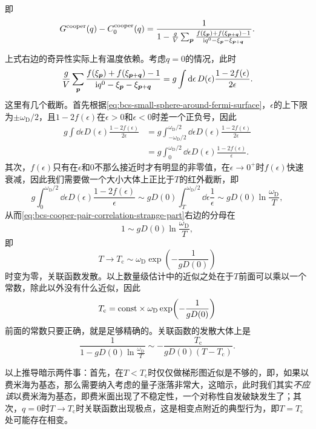 即
\begin{equation}
    G^\text{cooper}(q) - C^\text{cooper}_0(q) = \frac{1}{1 - \frac{g}{V} \sum_{\vb*{p}} \frac{f(\xi_{\vb*{p}}) + f(\xi_{\vb*{p}+\vb*{q}}) - 1}{\mathrm{i} q^0 - \xi_{\vb*{p}} - \xi_{\vb*{p} + \vb*{q}}}}.
    \label{eq:bcs-cooper-pair-correlation-strange-part}
\end{equation}

上式右边的奇异性实际上有温度依赖。考虑$q=0$的情况，此时
\[
    \frac{g}{V} \sum_{\vb*{p}} \frac{f(\xi_{\vb*{p}}) + f(\xi_{\vb*{p}+\vb*{q}}) - 1}{\mathrm{i} q^0 - \xi_{\vb*{p}} - \xi_{\vb*{p} + \vb*{q}}} = g \int \dd{\epsilon} D(\epsilon) \frac{1 - 2f(\epsilon)}{2\epsilon}.
\]
这里有几个截断。首先根据\eqref{eq:bcs-small-sphere-around-fermi-surface}，$\epsilon$的上下限为$\pm \omega_\text{D} / 2$，且$1-2f(\epsilon)$在$\epsilon > 0$和$\epsilon < 0$时差一个正负号，因此
\[
    \begin{aligned}
        g \int \dd{\epsilon} D(\epsilon) \frac{1 - 2f(\epsilon)}{2\epsilon} &= g \int_{-\omega_\text{D}/2}^{\omega_\text{D}/2} \dd{\epsilon} D(\epsilon) \frac{1 - 2f(\epsilon)}{2\epsilon} \\
        &= g \int_{0}^{\omega_\text{D}/2} \dd{\epsilon} D(\epsilon) \frac{1 - 2f(\epsilon)}{\epsilon}.
    \end{aligned}
\]
其次，$f(\epsilon)$只有在$\epsilon$和$0$不那么接近时才有明显的非零值，在$\epsilon \to 0^+$时$f(\epsilon)$快速衰减，因此我们需要做一个大小大体上正比于$T$的红外截断，即
\[
    g \int_{0}^{\omega_\text{D}/2} \dd{\epsilon} D(\epsilon) \frac{1 - 2f(\epsilon)}{\epsilon} \sim g D(0) \int_{T}^{\omega_\text{D}/2} \dd{\epsilon} \frac{1}{\epsilon} \sim g D(0) \ln\frac{\omega_\text{D}}{T},
\]
从而\eqref{eq:bcs-cooper-pair-correlation-strange-part}右边的分母在
\[
    1 \sim g D(0) \ln\frac{\omega_\text{D}}{T},
\]
即
\begin{equation}
    T \to T_\text{c} \sim \omega_\text{D} \exp(- \frac{1}{g D(0)})
\end{equation}
时变为零，关联函数发散。以上数量级估计中的近似之处在于$T$前面可以乘以一个常数，除此以外没有什么近似，因此
\begin{equation}
    T_\text{c} = \mathrm{const} \times \omega_\text{D} \exp(- \frac{1}{g D(0)})
\end{equation}
前面的常数只要正确，就是足够精确的。关联函数的发散大体上是
\[
    \frac{1}{1 - g D(0) \ln \frac{\omega_\text{D}}{T}} \sim - \frac{T_\text{c}}{g D(0) (T - T_\text{c})}.
\]

以上推导暗示两件事：首先，在$T < T_\text{c}$时仅仅做梯形图近似是不够的，即，如果以费米海为基态，那么需要纳入考虑的量子涨落非常大，这暗示，此时我们其实\emph{不应该}以费米海为基态，即费米面出现了不稳定性，一个对称性自发破缺发生了；其次，$q=0$时$T \to T_\text{c}$时关联函数出现极点，这是相变点附近的典型行为，即$T = T_\text{c}$处可能存在相变。

